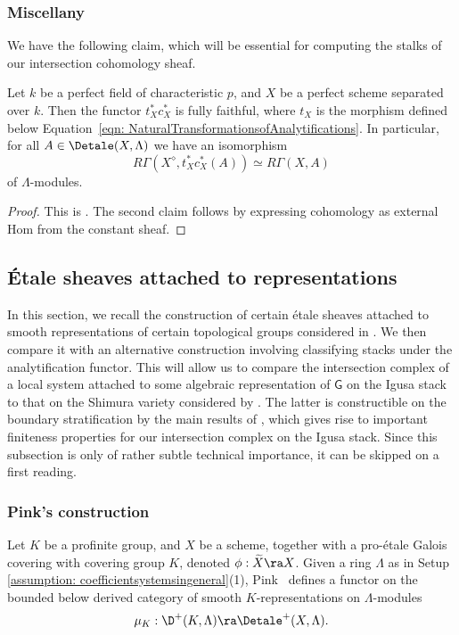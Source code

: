 \documentclass[letterpaper,11pt]{amsart}
\begin{document}
\subsubsection{Miscellany}
We have the following claim, which will be essential for computing the stalks of our intersection cohomology sheaf.
\begin{proposition}\label{prop: SmallDiamondvsPerfectScheme}
        Let $k$ be a perfect field of characteristic $p$, and $X$ be a perfect scheme separated over $k$. Then the functor $t_X^\ast c_X^\ast$ is fully faithful, where $t_X$ is the morphism defined below Equation~\eqref{eqn: NaturalTransformationsofAnalytifications}. In particular, for all $A \in \Detale(X,\Lambda)$ we have an isomorphism 
        \[ R\Gamma(X^{\diamond},t_{X}^{*}c_{X}^{*}(A)) \simeq R\Gamma(X,A) \]
        of $\Lambda$-modules.
    \end{proposition}
    \begin{proof}
        This is {\cite[Proposition 4.2]{GleasonTubularNeighborhoods}}. The second claim follows by expressing cohomology as external Hom from the constant sheaf.
    \end{proof}

\subsection{\'Etale sheaves attached to representations}\label{sec: EtaleSheavesRep}
In this section, we recall the construction of certain \'etale sheaves attached to smooth representations of certain topological groups considered in \cite[Section~1.10]{PinkHigherDirectImages}. We then compare it with an alternative construction involving classifying stacks under the analytification functor. This will allow us to compare the intersection complex of a local system attached to some algebraic representation of $\mathsf{G}$ on the Igusa stack to that on the Shimura variety considered by \cite{PinkHigherDirectImages}. The latter is constructible on the boundary stratification by the main results of \cite{PinkHigherDirectImages}, which gives rise to important finiteness properties for our intersection complex on the Igusa stack. Since this subsection is only of rather subtle technical importance, it can be skipped on a first reading. 

\subsubsection{Pink's construction}{\label{ss: PinksConstruction}}
Let $K$ be a profinite group, and $X$ be a scheme, together with a pro-\'etale Galois covering with covering group $K$, denoted $\phi: \widetilde{X} \ra X$. Given a ring $\Lambda$ as in Setup \ref{assumption: coefficientsystemsingeneral}(1), Pink~\cite{PinkHigherDirectImages} defines a functor on the bounded below derived category of smooth $K$-representations on $\Lambda$-modules
\[ \mu_{K}: \D^+(K,\Lambda) \ra \Detale^+(X,\Lambda). \]
\end{document}
